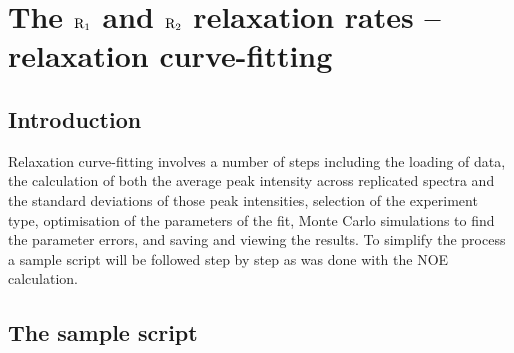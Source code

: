 
\chapter[Relaxation curve-fitting]{The $\mathrm{R}_1$ and $\mathrm{R}_2$ relaxation rates -- relaxation curve-fitting}




\section{Introduction}

Relaxation curve-fitting involves a number of steps including the loading of data, the calculation of both the average peak intensity across replicated spectra and the standard deviations of those peak intensities, selection of the experiment type, optimisation of the parameters of the fit, Monte Carlo simulations to find the parameter errors, and saving and viewing the results.  To simplify the process a sample script will be followed step by step as was done with the NOE calculation.




\section{The sample script}

